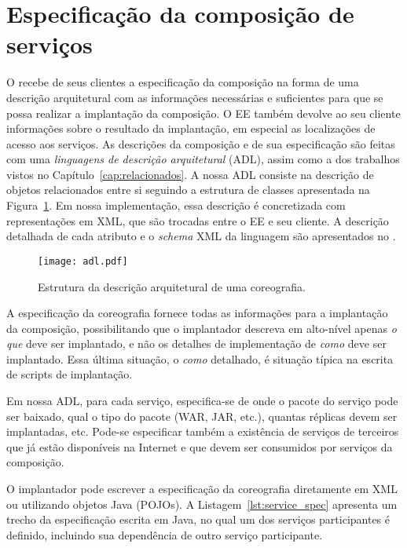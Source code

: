 \section{Especificação da composição de serviços}
\label{sec:spec}

O \ee recebe de seus clientes a especificação da composição na forma 
de uma descrição arquitetural com as informações necessárias e suficientes para 
que se possa realizar a implantação da composição. 
O EE também devolve ao seu cliente informações sobre o resultado da implantação, 
em especial as localizações de acesso aos serviços. As descrições da composição e de sua 
especificação são feitas com uma \emph{linguagens de descrição arquitetural} (ADL), 
assim como a dos trabalhos vistos no Capítulo~\ref{cap:relacionados}. 
A nossa ADL consiste na descrição de objetos relacionados entre si seguindo 
a estrutura de classes apresentada na Figura~\ref{fig:adl}. 
Em nossa implementação, essa descrição é concretizada com representações em XML, 
que são trocadas entre o EE e seu cliente. 
A descrição detalhada de cada atributo e o \emph{schema} XML da linguagem
são apresentados no \userguide.

\begin{figure}[!h]
  \centering
  \texttt{[image: adl.pdf]} 
  \caption{Estrutura da descrição arquitetural de uma coreografia. }
  \label{fig:adl} 
\end{figure}

A especificação da coreografia fornece todas as informações para a implantação da composição,
possibilitando que o implantador descreva em alto-nível apenas \emph{o que} deve ser implantado,
e não os detalhes de implementação de \emph{como} deve ser implantado.
Essa última situação, o \emph{como} detalhado, é situação típica na escrita de scripts de implantação.

Em nossa ADL, para cada serviço, especifica-se de onde o pacote do serviço pode ser baixado, 
qual o tipo do pacote (WAR, JAR, etc.), quantas réplicas devem ser implantadas, etc.
Pode-se especificar também a existência de serviços
de terceiros que já estão disponíveis na Internet e que devem
ser consumidos por serviços da composição.

O implantador pode escrever a especificação da coreografia diretamente em XML
ou utilizando objetos Java (POJOs).
A Listagem~\ref{lst:service_spec} apresenta um trecho da especificação escrita em Java,
no qual um dos serviços participantes é definido,
incluindo sua dependência de outro serviço participante.

